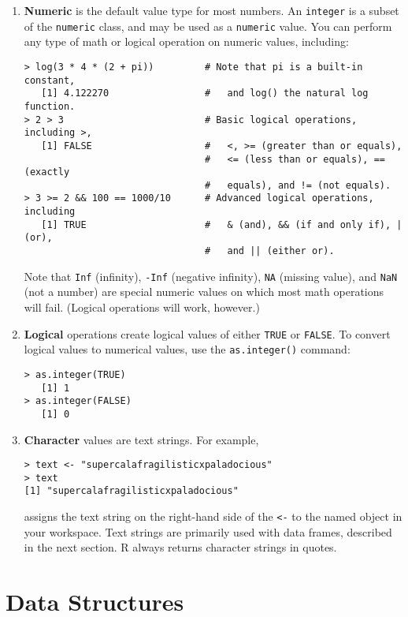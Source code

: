 \begin{enumerate}
\item \textbf{Numeric} is the default value type for most numbers.  An
  \texttt{integer} is a subset of the \texttt{numeric} class, and may
  be used as a \texttt{numeric} value.  You can perform
  any type of math or logical operation on numeric values,
  including:
\begin{verbatim}
> log(3 * 4 * (2 + pi))         # Note that pi is a built-in constant, 
   [1] 4.122270                 #   and log() the natural log function.
> 2 > 3                         # Basic logical operations, including >,
   [1] FALSE                    #   <, >= (greater than or equals), 
                                #   <= (less than or equals), == (exactly 
                                #   equals), and != (not equals). 
> 3 >= 2 && 100 == 1000/10      # Advanced logical operations, including
   [1] TRUE                     #   & (and), && (if and only if), | (or), 
                                #   and || (either or).
\end{verbatim}
  Note that \texttt{Inf} (infinity), \texttt{-Inf} (negative
  infinity), \texttt{NA} (missing value), and \texttt{NaN} (not a
  number) are special numeric values on which most math operations
  will fail.  (Logical operations will work, however.)

\item \textbf{Logical} operations create logical values of either
  \texttt{TRUE} or \texttt{FALSE}.  To convert logical values to
  numerical values, use the \texttt{as.integer()} command:
\begin{verbatim}
> as.integer(TRUE)
   [1] 1 
> as.integer(FALSE)
   [1] 0
\end{verbatim}
\item \textbf{Character} values are text strings.  For example, 
\begin{verbatim}
> text <- "supercalafragilisticxpaladocious"
> text
[1] "supercalafragilisticxpaladocious"
\end{verbatim}
  assigns the text string on the right-hand side of the \texttt{<-} to
  the named object in your workspace.  Text strings are primarily used
  with data frames, described in the next section.  R always returns
  character strings in quotes.
\end{enumerate}

\section{Data Structures}

